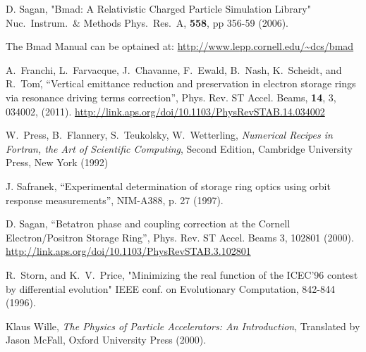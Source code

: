 \begin{thebibliography}{99}

D. Sagan,
"Bmad: A Relativistic Charged Particle Simulation Library"
Nuc.\ Instrum.\ \& Methods Phys.\ Res.\ A, {\bf 558}, pp 356-59 (2006).

The Bmad Manual can be optained at:
\hfill\break
\hspace*{20pt} 
\url{http://www.lepp.cornell.edu/~dcs/bmad}

A.~Franchi, L.~Farvacque, J.~Chavanne, F.~Ewald, B.~Nash, K.~Scheidt, and R.~Tom\',
``Vertical emittance reduction and preservation in electron storage rings via resonance driving terms correction'',
Phys. Rev. ST Accel. Beams,
{\bf 14}, 3, 034002, (2011). 
\hfill\break
\hspace*{20pt}
\url{http://link.aps.org/doi/10.1103/PhysRevSTAB.14.034002}

W.~Press, B.~Flannery, S.~Teukolsky, W.~Wetterling,
{\em Numerical Recipes in Fortran, the Art of Scientific Computing},
Second Edition, Cambridge University Press, New York (1992)

J. Safranek, ``Experimental determination of storage ring optics
using orbit response measurements'', NIM-A388, p. 27 (1997).

D. Sagan,
``Betatron phase and coupling correction at the Cornell Electron/Positron
Storage Ring'', Phys. Rev. ST Accel. Beams 3, 102801 (2000).
\hfill\break
\hspace*{20pt}
\url{http://link.aps.org/doi/10.1103/PhysRevSTAB.3.102801}

R.~Storn, and K.~V.~Price, "Minimizing the real function of the
ICEC'96 contest by differential evolution" IEEE conf. on Evolutionary
Computation, 842-844 (1996).

Klaus Wille, {\em The Physics of Particle Accelerators: An Introduction},
Translated by Jason McFall, Oxford University Press (2000).

\end{thebibliography}
